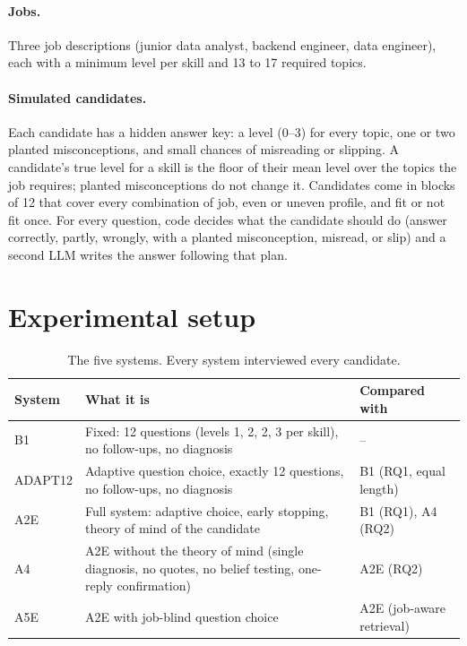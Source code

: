 \documentclass[10pt,a4paper]{article}
\begin{document}
\paragraph{Jobs.} Three job descriptions (junior data analyst, backend engineer, data engineer),
each with a minimum level per skill and 13 to 17 required topics.

\paragraph{Simulated candidates.} Each candidate has a hidden answer key: a level (0--3) for every
topic, one or two planted misconceptions, and small chances of misreading or slipping. A
candidate's true level for a skill is the floor of their mean level over the topics the job
requires; planted misconceptions do not change it. Candidates come in blocks of 12 that cover every
combination of job, even or uneven profile, and fit or not fit once. For every question, code decides
what the candidate should do (answer correctly, partly, wrongly, with a planted misconception,
misread, or slip) and a second LLM writes the answer following that plan.

\section{Experimental setup}
\label{sec:setup}

\begin{table}[h]
\centering\small
\begin{tabularx}{\linewidth}{@{}l X l@{}}
\toprule
System & What it is & Compared with \\
\midrule
B1 & Fixed: 12 questions (levels 1, 2, 2, 3 per skill), no follow-ups, no diagnosis & -- \\
ADAPT12 & Adaptive question choice, exactly 12 questions, no follow-ups, no diagnosis & B1 (RQ1, equal length) \\
A2E & Full system: adaptive choice, early stopping, theory of mind of the candidate & B1 (RQ1), A4 (RQ2) \\
A4 & A2E without the theory of mind (single diagnosis, no quotes, no belief testing, one-reply confirmation) & A2E (RQ2) \\
A5E & A2E with job-blind question choice & A2E (job-aware retrieval) \\
\bottomrule
\end{tabularx}
\caption{The five systems. Every system interviewed every candidate.}
\label{tab:systems}
\end{table}
\end{document}
